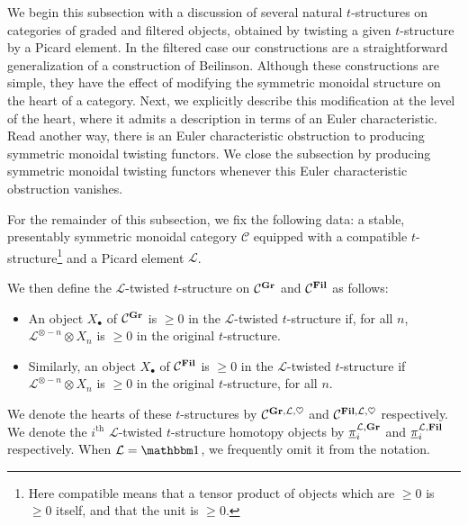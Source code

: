 %
We begin this subsection with a discussion of several natural $t$-structures on categories of graded and filtered objects, obtained by twisting a given $t$-structure by a Picard element.
In the filtered case our constructions are a straightforward generalization of a construction of Beilinson. Although these constructions are simple, they have the effect of modifying the symmetric monoidal structure on the heart of a category.
Next, we explicitly describe this modification at the level of the heart, where it admits a description in terms of an Euler characteristic. Read another way, there is an Euler characteristic obstruction to producing symmetric monoidal twisting functors. 
We close the subsection by producing symmetric monoidal twisting functors whenever this Euler characteristic obstruction vanishes.


\begin{dfn} \label{dfn:L-twist}
  For the remainder of this subsection, we fix the following data:
  a stable, presentably symmetric monoidal category $\mathcal{C}$
  equipped with a compatible $t$-structure\footnote{Here compatible means that a tensor product of objects which are $\geq 0$ is $\geq 0$ itself, and that the unit is $\geq 0$.}
  and a Picard element $\mathcal{L}$.

  We then define the $\mathcal{L}$-twisted $t$-structure on $\mathcal{C}^{\operatorname{\mathbf{Gr}}}$ and $\mathcal{C}^{\operatorname{\mathbf{Fil}}}$ as follows:
  \begin{itemize}
  \item An object $X_\bullet$ of $\mathcal{C}^{\operatorname{\mathbf{Gr}}}$ is $\geq 0$ in the $\mathcal{L}$-twisted $t$-structure if, for all $n$, $\mathcal{L}^{\otimes -n} \otimes X_n$ is $\geq 0$ in the original $t$-structure.
  \item Similarly, an object $X_\bullet$ of $\mathcal{C}^{\operatorname{\mathbf{Fil}}}$ is $\geq 0$ in the $\mathcal{L}$-twisted $t$-structure if $\mathcal{L} ^{\otimes -n} \otimes X_n$ is $\geq 0$ in the original $t$-structure, for all $n$.
  \end{itemize}
  We denote the hearts of these $t$-structures by $\mathcal{C}^{\operatorname{\mathbf{Gr}}, \mathcal{L}, \heartsuit}$ and $\mathcal{C}^{\operatorname{\mathbf{Fil}}, \mathcal{L}, \heartsuit}$ respectively.
  We denote the $i^{\mathrm{th}}$ $\mathcal{L}$-twisted $t$-structure homotopy objects by $\underline{\pi}_{i} ^{\mathcal{L}, \operatorname{\mathbf{Gr}}}$ and $\underline{\pi}_{i} ^{\mathcal{L}, \operatorname{\mathbf{Fil}}}$ respectively.
  When $\mathcal{L} = \o$, we frequently omit it from the notation.
\end{dfn}


